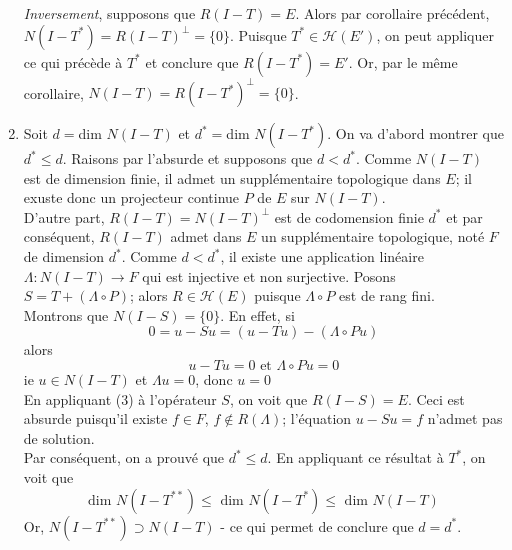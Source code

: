 \begin{dem}
\begin{enumerate}
\bigskip
\textit{Inversement}, supposons que $R(I-T)=E$. Alors par corollaire précédent, $N(I-T^*)=R(I-T)^\perp=\{0\}$. Puisque $T^*\in\mathscr{H}(E')$, on peut appliquer ce qui précède à $T^*$ et conclure que $R(I-T^*)=E'$. Or, par le même corollaire, $N(I-T)=R(I-T^*)^\perp=\{0\}$.

	\item Soit $d=$dim $N(I-T)$ et $d^*=$dim $N(I-T^*)$. On va d'abord montrer que $d^*\leq d$. Raisons par l'absurde et supposons que $d<d^*$. Comme $N(I-T)$ est de dimension finie, il admet un supplémentaire topologique dans $E$; il exuste donc un projecteur continue $P$ de $E$ sur $N(I-T)$.\\
D'autre part, $R(I-T)=N(I-T)^\perp$ est de codomension finie $d^*$ et par conséquent, $R(I-T)$ admet dans $E$ un supplémentaire topologique, noté $F$ de dimension $d^*$. Comme $d<d^*$, il existe une application linéaire $\Lambda:N(I-T)\to F$ qui est injective et non surjective. Posons $S=T+(\Lambda\circ P)$; alors $R\in\mathscr{H}(E)$ puisque $\Lambda\circ P$ est de rang fini.\\
Montrons que $N(I-S)=\{0\}$. En effet, si \[0=u-Su=(u-Tu)-(\Lambda\circ Pu)\]
alors \[u-Tu=0 \text{ et } \Lambda\circ Pu=0\]
ie $u\in N(I-T)$ et $\Lambda u=0$, donc $u=0$\\
En appliquant (3) à l'opérateur $S$, on voit que $R(I-S)=E$. Ceci est absurde puisqu'il existe $f\in F$, $f\not\in R(\Lambda)$; l'équation $u-Su=f$ n'admet pas de solution.\\
Par conséquent, on a prouvé que $d^*\leq d$. En appliquant ce résultat à $T^*$, on voit que \[\text{dim }N(I-T^{**})\leq \text{ dim }N(I-T^*)\leq \text{ dim }N(I-T)\]
Or, $N(I-T^{**})\supset N(I-T)$ - ce qui permet de conclure que $d=d^*$.
\end{enumerate}
\end{dem}


